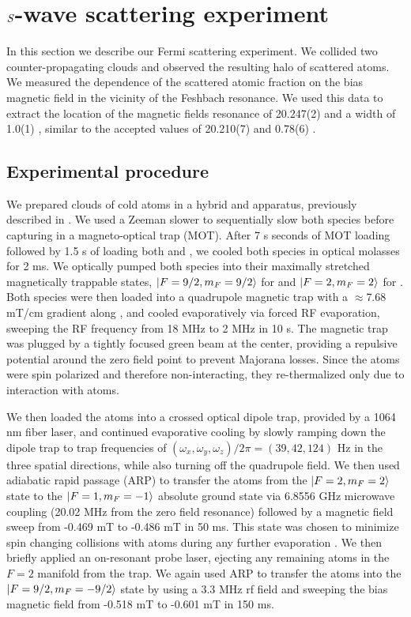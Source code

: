 \documentclass[12pt]{iopart}
\begin{document}
\section{$\it{S}$-wave scattering experiment}
In this section we describe our Fermi scattering experiment. We collided two counter-propagating \K{} clouds and observed the resulting \swave{} halo of scattered atoms.  We measured the dependence of the scattered atomic fraction on the bias magnetic field in the vicinity of the Feshbach resonance. We used this data to extract the location of the magnetic fields resonance of 20.247(2) \mT{} and a width of 1.0(1) \mT{}, similar to the accepted values of 20.210(7) \mT{} and 0.78(6) \mT{} \cite{Regal04}.
\subsection{Experimental procedure}
We prepared clouds of cold \K{} atoms in a hybrid \K{} and \Rb{} apparatus, previously described in \cite{Williams13, Lin09, KarinaThesis}. We used a Zeeman slower to sequentially slow both species before capturing in a magneto-optical trap (MOT). After 7 s seconds of MOT loading \K{} followed by 1.5 s of loading both \K{} and \Rb{}, we cooled both species in optical molasses for 2 ms. We optically pumped both species into their maximally stretched magnetically trappable states, $\mathinner{|{F=9/2, m_F=9/2}\rangle}$ for \K{} and $\mathinner{|{F=2,m_F=2}\rangle}$ for \Rb{}. Both species were then loaded into a quadrupole magnetic trap with a $\approx$7.68 mT/cm gradient along \ez{}, and cooled evaporatively via forced RF evaporation, sweeping the RF frequency from 18 MHz to 2 MHz in 10 s. The magnetic trap was plugged by a tightly focused green beam at the center, providing a repulsive potential around the zero field point to prevent Majorana losses. Since the \K{} atoms were spin polarized and therefore non-interacting, they re-thermalized only due to interaction with \Rb{} atoms.
\par We then loaded the atoms into a crossed optical dipole trap, provided by a 1064 nm fiber laser, and continued evaporative cooling by slowly ramping down the dipole trap to trap frequencies of $(\omega_x,\omega_y,\omega_z)/2\pi =(39, 42, 124)$ Hz in the three spatial directions, while also turning off the quadrupole field. We then used adiabatic rapid passage (ARP) to transfer the \Rb{} atoms from the $\mathinner{|{F=2, m_F=2}\rangle}$ state to the  $\mathinner{|{F=1, m_F=-1}\rangle}$ absolute ground state via 6.8556 GHz microwave coupling (20.02 MHz from the zero field resonance) followed by a magnetic field sweep from -0.469 mT to -0.486 mT in 50 ms. This state was chosen to minimize spin changing collisions with \K{} atoms during any further evaporation \cite{BestThesis}.  We then briefly applied an on-resonant probe laser, ejecting any remaining \Rb{} atoms in the $F=2$ manifold from the trap. We again used ARP to transfer the \K{} atoms into the $\mathinner{|{F=9/2,m_F=-9/2}\rangle}$ state by using a 3.3 MHz rf field and sweeping the bias magnetic field from -0.518 mT to -0.601 mT in 150 ms.
\end{document}
